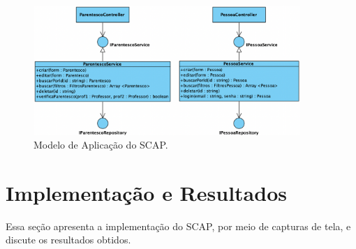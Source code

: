 \begin{figure}[h!]
    \centering
    \includegraphics[width=0.9\textwidth]{figuras/fig-modelo-apl-2.png}
    \caption{Modelo de Aplicação do SCAP.}
    \label{fig-modelo-aplicacao-2}
\end{figure}


\section{Implementação e Resultados}
\label{sec-projeto-impl}

Essa seção apresenta a implementação do SCAP, por meio de capturas de tela,
e discute os resultados obtidos.
